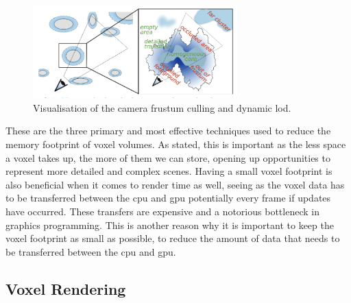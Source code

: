 \documentclass[titlepage]{article}
\begin{document}
\begin{figure}[htp]
  \centering
  \includegraphics[width=0.7\textwidth]{frustum.png}
  \caption{Visualisation of the camera frustum culling and dynamic \gls{lod}.}
\end{figure}
\FloatBarrier

These are the three primary and most effective techniques used to reduce the memory footprint of voxel volumes. As stated, this is important as the less space a voxel takes up, the more of them we can store, opening up opportunities to represent more detailed and complex scenes. Having a small voxel footprint is also beneficial when it comes to render time as well, seeing as the voxel data has to be transferred between the \gls{cpu} and \gls{gpu} potentially every frame if updates have occurred. These transfers are expensive and a notorious bottleneck in graphics programming. This is another reason why it is important to keep the voxel footprint as small as possible, to reduce the amount of data that needs to be transferred between the \gls{cpu} and \gls{gpu}.

\subsection{Voxel Rendering}
\end{document}
